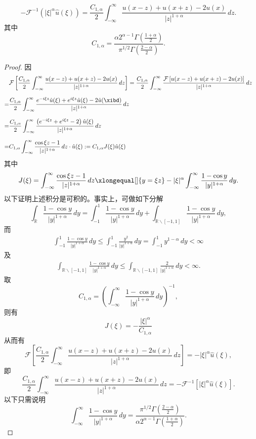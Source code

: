 \begin{dingli}
\begin{equation}  
-\mathcal F^{-1}(|\xi|^\alpha\hat u(\xi)) = \frac{C_{1,\alpha}}2 \int_{-\infty}^\infty \frac{u(x-z)+u(x+z)-2u(x)}{|z|^{1+\alpha}}\,dz.
\end{equation}
其中
$$
C_{1,\alpha}=\frac{\alpha 2^{\alpha-1}\Gamma(\frac{1+\alpha}2)}{\pi^{1/2}\Gamma(\frac{2-\alpha}2)}.
$$
\end{dingli}
\begin{proof}
因
\begin{equation}\label{FL_fourier}
\begin{aligned}
 & \mathcal F\left[\frac{C_{1,\alpha}}2 \int_{-\infty}^\infty \frac{u(x-z)+u(x+z)-2u(x)}{|z|^{1+\alpha}}\,dz\right] 
= \frac{C_{1,\alpha}}2 \int_{-\infty}^\infty \frac{\mathcal F\left[u(x-z)+u(x+z)-2u(x)\right]}{|z|^{1+\alpha}}\,dz\\[0.1in]
=& \frac{C_{1,\alpha}}2 \int_{-\infty}^\infty \frac{e^{-  i \xi  z}\hat u(\xi)+e^{ i \xi  z}\hat u(\xi)-2\hat u(\xibd)}{|z|^{1+\alpha}}\,dz\\[0.1in]
=& \frac{C_{1,\alpha}}2 \int_{-\infty}^\infty \frac{\left(e^{-  i \xi   z}+e^{  i \xi  z}-2\right)\hat u(\xi) }{|z|^{1+\alpha}}\,dz\\[0.1in]
=&  C_{1,\alpha} \int_{-\infty}^\infty\frac{ \cos \xi z-1}{|z|^{1+\alpha}}\,dz\cdot \hat u(\xi):= C_{1,\alpha} J(\xi) \hat u(\xi)
\end{aligned}
\end{equation}
其中
$$
\begin{aligned}
J(\xi) = \int_{-\infty}^\infty\frac{ \cos \xi z-1}{|z|^{1+\alpha}}\,dz\xlongequal[]{y=\xi z} -|\xi|^\alpha \int_{-\infty}^\infty\frac{ 1-\cos y }{|y|^{1+\alpha}}\,dy.
\end{aligned}
$$
以下证明上述积分是可积的。事实上，可做如下分解
$$
\int_{\mathbb R} \frac{ 1-\cos y }{|y|^{1+\alpha}}\,dy = \int_{-1}^1\frac{ 1-\cos y }{|y|^{1+\alpha}}\,dy + \int_{\mathbb R\backslash [-1,1]}\frac{ 1-\cos y }{|y|^{1+\alpha}}\,dy,
$$
而
$$
\begin{aligned}
\int_{-1}^1\frac{ 1-\cos y }{|y|^{1+\alpha}}\,dy \le \int_{-1}^1\frac{ y^2 }{|y|^{1+\alpha}}\,dy = \int_{-1}^1y^{1-\alpha}\,dy < \infty
\end{aligned}
$$
及
$$
\begin{aligned}
\int_{\mathbb R\backslash [-1,1]}\frac{ 1-\cos y }{|y|^{1+\alpha}}\,dy \le \int_{\mathbb R\backslash [-1,1]}\frac{2 }{|y|^{1+\alpha}}\,dy < \infty.
\end{aligned}
$$
取
$$
C_{1,\alpha}=\left(\int_{-\infty}^\infty\frac{ 1-\cos y }{|y|^{1+\alpha}}\,dy\right)^{-1},
$$
则有
$$
J(\xi)=-\frac{|\xi|^\alpha}{C_{1,\alpha}}
$$
从而有
$$
\mathcal F\left[\frac{C_{1,\alpha}}2 \int_{-\infty}^\infty \frac{u(x-z)+u(x+z)-2u(x)}{|z|^{1+\alpha}}\,dz\right] = -|\xi|^\alpha \hat u(\xi),
$$
即
$$
\frac{C_{1,\alpha}}2 \int_{-\infty}^\infty \frac{u(x-z)+u(x+z)-2u(x)}{|z|^{1+\alpha}}\,dz=-\mathcal F^{-1}\left[|\xi|^\alpha \hat u(\xi)\right].
$$
以下只需说明
$$
\int_{-\infty}^\infty\frac{ 1-\cos y }{|y|^{1+\alpha}}\,dy=\frac{\pi^{1/2}\Gamma(\frac{2-\alpha}2)}{\alpha 2^{\alpha-1}\Gamma(\frac{1+\alpha}2)}.
$$
\end{proof}



